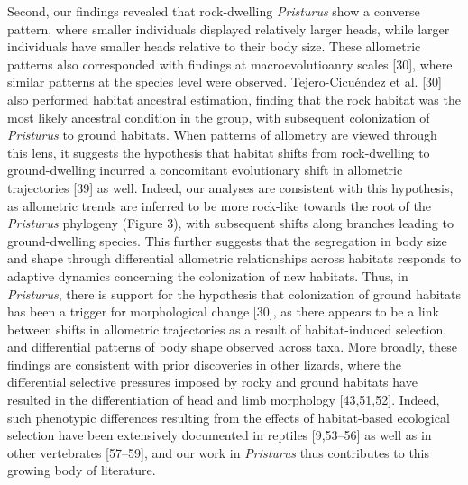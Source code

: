 \documentclass[
  11pt,
]{article}
\begin{document}
Second, our findings revealed that rock-dwelling \emph{Pristurus} show a
converse pattern, where smaller individuals displayed relatively larger
heads, while larger individuals have smaller heads relative to their
body size. These allometric patterns also corresponded with findings at
macroevolutioanry scales {[}30{]}, where similar patterns at the species
level were observed. Tejero-Cicuéndez et al. {[}30{]} also performed
habitat ancestral estimation, finding that the rock habitat was the most
likely ancestral condition in the group, with subsequent colonization of
\emph{Pristurus} to ground habitats. When patterns of allometry are
viewed through this lens, it suggests the hypothesis that habitat shifts
from rock-dwelling to ground-dwelling incurred a concomitant
evolutionary shift in allometric trajectories {[}39{]} as well. Indeed,
our analyses are consistent with this hypothesis, as allometric trends
are inferred to be more rock-like towards the root of the
\emph{Pristurus} phylogeny (Figure 3), with subsequent shifts along
branches leading to ground-dwelling species. This further suggests that
the segregation in body size and shape through differential allometric
relationships across habitats responds to adaptive dynamics concerning
the colonization of new habitats. Thus, in \emph{Pristurus}, there is
support for the hypothesis that colonization of ground habitats has been
a trigger for morphological change {[}30{]}, as there appears to be a
link between shifts in allometric trajectories as a result of
habitat-induced selection, and differential patterns of body shape
observed across taxa. More broadly, these findings are consistent with
prior discoveries in other lizards, where the differential selective
pressures imposed by rocky and ground habitats have resulted in the
differentiation of head and limb morphology {[}43,51,52{]}. Indeed, such
phenotypic differences resulting from the effects of habitat-based
ecological selection have been extensively documented in reptiles
{[}9,53--56{]} as well as in other vertebrates {[}57--59{]}, and our
work in \emph{Pristurus} thus contributes to this growing body of
literature. \hfill\break
\end{document}

